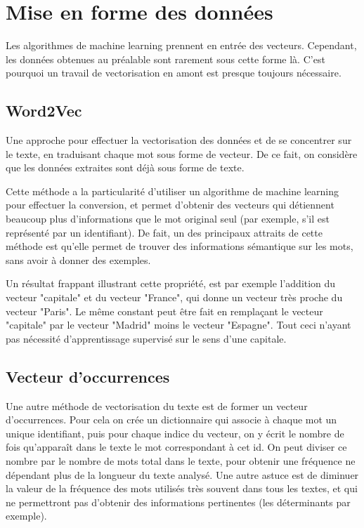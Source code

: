 \chapter{Mise en forme des données}

Les algorithmes de machine learning prennent en entrée des vecteurs. Cependant, les données obtenues au préalable sont rarement sous cette forme là. C'est pourquoi un travail de vectorisation en amont est presque toujours nécessaire.

\section{Word2Vec}

Une approche pour effectuer la vectorisation des données et de se concentrer sur le texte, en traduisant chaque mot sous forme de vecteur. De ce fait, on considère que les données extraites sont déjà sous forme de texte.

Cette méthode a la particularité d'utiliser un algorithme de machine learning pour effectuer la conversion, et permet d'obtenir des vecteurs qui détiennent beaucoup plus d'informations que le mot original seul (par exemple, s'il est représenté par un identifiant). De fait, un des principaux attraits de cette méthode est qu'elle permet de trouver des informations sémantique sur les mots, sans avoir à donner des exemples.

Un résultat frappant illustrant cette propriété, est par exemple l'addition du vecteur "capitale" et du vecteur "France", qui donne un vecteur très proche du vecteur "Paris". Le même constant peut être fait en remplaçant le vecteur "capitale" par le vecteur "Madrid" moins le vecteur "Espagne". Tout ceci n'ayant pas nécessité d'apprentissage supervisé sur le sens d'une capitale.

\section{Vecteur d'occurrences}

Une autre méthode de vectorisation du texte est de former un vecteur d'occurrences. Pour cela on crée un dictionnaire qui associe à chaque mot un unique identifiant, puis pour chaque indice du vecteur, on y écrit le nombre de fois qu'apparaît dans le texte le mot correspondant à cet id. On peut diviser ce nombre par le nombre de mots total dans le texte, pour obtenir une  fréquence ne dépendant plus de la longueur du texte analysé. Une autre astuce est de diminuer la valeur de la fréquence des mots utilisés très souvent dans tous les textes, et qui ne permettront pas d'obtenir des informations pertinentes (les déterminants par exemple).

